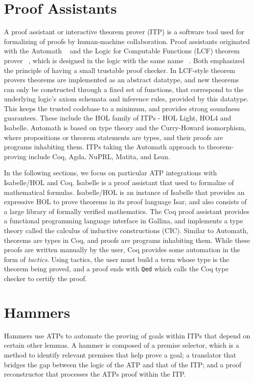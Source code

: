 \documentclass{article}
\begin{document}
\section{Proof Assistants}
\label{sec:itp}
	A proof assistant or interactive theorem prover 
	(ITP) is a software tool used for formalizing 
	of proofs by human-machine collaboration.
	Proof assistants originated with the Automath
	~\cite{10.1007/BFb0060623} and the Logic for 
	Computable Functions (LCF) theorem prover ~\cite{10.5555/891954}, which is designed 
	in the logic with the same name
	~\cite{Loeckx1987}. Both emphasized the 
	principle of having a small trustable proof 
	checker. In LCF-style theorem provers theorems 
	are implemented as an abstract datatype, and 
	new theorems can only be constructed through a 
	fixed set of functions, that correspond to the 
	underlying logic's axiom schemata and inference 
	rules, provided by this datatype. This keeps
	the trusted codebase to a minimum, and 
	provides strong soundness guarantees. These 
	include the HOL family of ITPs - HOL Light, 
	HOL4 and Isabelle. Automath is based on type 
	theory and the Curry-Howard isomorphism, where 
	propositions or theorem statements are types, 
	and their proofs are programs inhabiting them. 
	ITPs taking the Automath approach to 
	theorem-proving include Coq, Agda, NuPRL, 
	Matita, and Lean.
	
	In the following sections, we focus on 
	particular ATP integrations with Isabelle/HOL 
	and Coq. Isabelle is a proof assistant that used 
	to formalize of mathematical formulas. 
	Isabelle/HOL is an instance of Isabelle that 
	provides an expressive HOL to prove theorems in 
	its proof language Isar, and also consists of a 
	large library of formally verified mathematics. 
	The Coq proof assistant provides a functional 
	programming language interface in Gallina, and 
	implements a type theory called the calculus of 
	inductive constructions (CIC). Similar to 
	Automath, theorems are types in Coq, and 
	proofs are programs inhabiting them. While these 
	proofs are written manually by the user, Coq 
	provides some automation in the form of 
	\textit{tactics}. Using tactics, the user 
	must build a term whose type is the theorem 
	being proved, and a proof ends with 
	\texttt{Qed} which calls the Coq type checker 
	to certify the proof.	
	
\section{Hammers}
\label{sec:hammer}
	Hammers use ATPs to automate the proving of goals within ITPs
	that depend on certain other lemmas. A hammer is composed of 
	a premise selector, which is a method to identify relevant 
	premises that help prove a goal; a translator that bridges 
	the gap between the logic of the ATP and that of the ITP; 
	and a proof reconstructor that processes the ATPs proof
	within the ITP.
	
\end{document}
